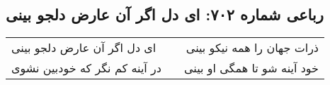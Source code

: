 \begin{center}
\section*{رباعی شماره ۷۰۲: ای دل اگر آن عارض دلجو بینی}
\label{sec:sh702}
\begin{longtable}{l p{0.5cm} r}
ای دل اگر آن عارض دلجو بینی
&&
ذرات جهان را همه نیکو بینی
\\
در آینه کم نگر که خودبین نشوی
&&
خود آینه شو تا همگی او بینی
\\
\end{longtable}
\end{center}

